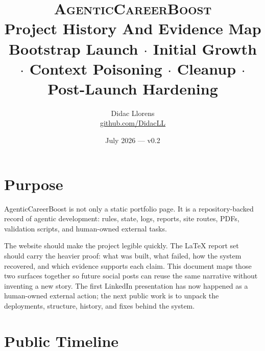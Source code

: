\documentclass[a4paper,11pt,openany]{report}
\title{%
  \textsc{AgenticCareerBoost}\\[0.4em]
  \Large Project History And Evidence Map\\[0.3em]
  \large Bootstrap Launch $\cdot$ Initial Growth $\cdot$ Context Poisoning $\cdot$ Cleanup $\cdot$ Post-Launch Hardening%
}
\author{Didac Llorens \\ \small \href{https://github.com/DidacLL}{github.com/DidacLL}}
\date{July 2026 --- v0.2}
\begin{document}
\maketitle
\tableofcontents
\newpage

\chapter{Purpose}


AgenticCareerBoost is not only a static portfolio page. It is a repository-backed
record of agentic development: rules, state, logs, reports, site routes, PDFs,
validation scripts, and human-owned external tasks.

The website should make the project legible quickly. The LaTeX report set should
carry the heavier proof: what was built, what failed, how the system recovered,
and which evidence supports each claim. This document maps those two surfaces
together so future social posts can reuse the same narrative without inventing a
new story. The first LinkedIn presentation has now happened as a human-owned
external action; the next public work is to unpack the deployments, structure,
history, and fixes behind the system.

\chapter{Public Timeline}

\end{document}
